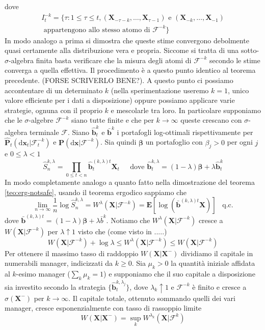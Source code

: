 \documentclass[a4paper,11pt]{book}
\theoremstyle{plain}
\theoremstyle{definition}
\theoremstyle{remark}
\newcommand{\dX}{\text{d}\bm{x}}
\newcommand{\X}{\bm{X}}
\newcommand{\B}{\bm{b}}
\newcommand{\F}{\mathcal{F}}
\newcommand{\Pro}{\mathbf{P}}
\newcommand{\E}{\mathbf{E}}
\newcommand{\bh}{\hat{\bm{b}}}
\newcommand{\Sh}{\hat{S}}
\newcommand{\Ph}{\hat{\mathbf{P}}}
\begin{document}
dove
\begin{align*}
	I^{-k}_t = \{\tau: 1\leq \tau \leq t, (\X_{-\tau-k},\ldots, \X_{\tau-1}) \text{ e } (\X_{-k},\ldots, \X_{-1})\\\text{ appartengono allo stesso atomo di }\F^{-k}\}
\end{align*}
In modo analogo a prima si dimostra che queste stime convergono debolmente quasi certamente alla distribuzione vera e propria. Siccome si tratta di una sotto-$\sigma$-algebra finita basta verificare che la misura degli atomi di $\F^{-k}$ secondo le stime converga a quella effettiva. Il procedimento è a questo punto identico al teorema precedente. (FORSE SCRIVERLO BENE?).\newline
A questo punto ci possiamo accontentare di un determinato $k$ (nella sperimentazione useremo $k=1$, unico valore efficiente per i dati a disposizione) oppure possiamo applicare varie strategie, ognuna con il proprio $k$ e mescolarle tra loro. In particolare supponiamo che le $\sigma$-algebre $\F^{-k}$ siano tutte finite e che per $k\to\infty$ queste crescano con $\sigma$-algebra terminale $\F$. \newline
Siano $\bh^{k}_t$ e $\bar{\B}^{k}$ i portafogli log-ottimali rispettivamente per $\Ph_t(\dX_t|\F^{-k}_t)$ e $\Pro(\dX|\F^{-k})$. Sia quindi $\bm{\beta}$ un portafoglio con $\beta_j >0$ per ogni $j$ e $0\leq \lambda <1$
\begin{equation*}
	\Sh_n^{k,\lambda}= \prod_{0\leq t <n}\bh_t^{(k,\lambda)t}\X_t \;\;\;\; \text{ dove } \bh^{k,\lambda}_t = (1-\lambda)\bm{\beta}+\lambda\bh_t^k
\end{equation*}
In modo completamente analogo a quanto fatto nella dimostrazione del teorema \ref{teo:erg-notsafe}, usando il teorema ergodico sappiamo che
\begin{equation*}
	\lim\limits_{n\to \infty}\frac{1}{n}\log\Sh_n^{k,\lambda}=W^\lambda(\X|\F^{-k})= \E[\log(\bar{\B}^{(k,\lambda)t}\X)] \;\;\; \text{q.c.}
\end{equation*}
dove $\bar{\B}^{(k,\lambda)t} = (1-\lambda)\bm{\beta}+\lambda\bar{b}^k$. Notiamo che $W^\lambda(\X|\F^{-k})$ cresce a $W(\X|\F^{-k})$ per $\lambda\uparrow 1$ visto che (come visto in  .....)
\begin{equation*}
	W(\X|\F^{-k}) +\log \lambda\leq W^\lambda(\X|\F^{-k})\leq W(\X|\F^{-k})
\end{equation*}
Per ottenere il massimo tasso di raddoppio $W(\X|\X^{-})$ dividiamo il capitale in numerabili manager, indicizzati da $k\geq 0$. Sia $\mu_k>0$ la quantità iniziale affidata al $k$-esimo manager ($\sum_k\mu_k = 1$) e supponiamo che il suo capitale a disposizione sia investito secondo la strategia $\{\bh^{k,\lambda_j}_t\}$, dove $\lambda_k\uparrow 1$ e $\F^{-k}$ è finito e cresce a $\sigma(\X^-)$ per $k\to \infty$. Il capitale totale, ottenuto sommando quelli dei vari manager, cresce esponenzialmente con tasso di rassoppio limite
\begin{equation*}
	W(\X|\X^{-}) = \sup\limits_k W^{\lambda_k}(\X|\F^{k})
\end{equation*}
\end{document}
